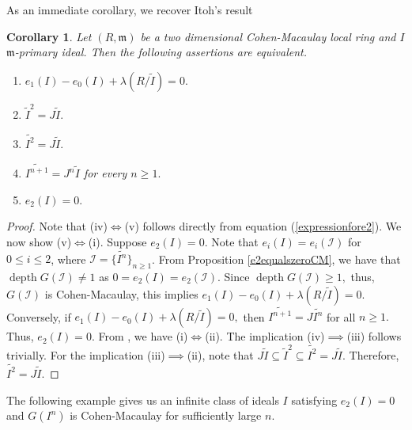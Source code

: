\documentclass[reqno,a4paper,dvipsnames]{amsart}
\newcommand{\m}{\mathfrak{m} }
\newcommand{\depth}{\operatorname{depth}}
\newtheorem{corollary}[theorem]{Corollary}
\theoremstyle{definition}
\begin{document}
As an immediate corollary, we recover Itoh's result \cite[Corollary 5]{itoh}

\begin{corollary}\cite[Corollary 5]{itoh} Let $(R, \m)$ be a two dimensional Cohen-Macaulay local ring and $I$ $\m$-primary ideal.
Then the following assertions are equivalent.
\begin{enumerate} [\normalfont(i)]
    \item $e_{1}(I)-e_{0}(I)+\lambda(R/\widetilde{I})=0.$
    \item $\widetilde{I}^{2}=J\widetilde{I}.$
    \item $\widetilde{I^{2}}=J\widetilde{I}.$
    \item $\widetilde{I^{n+1}}=J^{n}\widetilde{I}$ for every $n \geq 1.$
    \item $e_{2}(I)=0.$
\end{enumerate}
\end{corollary}
\begin{proof}
Note  that (iv)$\iff$(v) follows directly from equation (\ref{expressionfore2}).  We now show (v)$\iff$(i). Suppose $e_{2}(I)=0.$ Note that  $e_{i}(I)=e_{i}(\mathcal{I})$ for $0\leq i\leq 2$, where $\mathcal{I}=\{\widetilde{I^{n}}\}_{n\geq1}$. From Proposition \ref{e2equalszeroCM}, we have that $\depth G(\mathcal{I}) \neq 1$ as  $0=e_{2}(I)=e_{2}(\mathcal{I}).$ Since $\depth G(\mathcal{I}) \geq 1,$ thus, $G(\mathcal{I})$ is Cohen-Macaulay, this implies $e_{1}(I)-e_{0}(I)+\lambda(R/\widetilde{I})=0.$ Conversely, if $e_{1}(I)-e_{0}(I)+\lambda(R/\widetilde{I})=0,$ then $\widetilde{I^{n+1}}=J\widetilde{I^n}$ for all $n \geq 1.$ Thus, $e_{2}(I)=0.$
From \cite{huneke}, we have (i)$\iff$(ii).  The implication (iv)$\implies$(iii) follows trivially. For the implication (iii)$\implies$(ii), note that $J\widetilde{I} \subseteq \widetilde{I}^{2}\subseteq \widetilde{I^{2}}=J\widetilde{I}.$ Therefore, $\widetilde{I^{2}} =J\widetilde{I}.$
\end{proof}

\allowdisplaybreaks
The following example gives us an infinite class of ideals $I$ satisfying    $e_{2}(I)=0$ and $G(I^{n})$ is Cohen-Macaulay for sufficiently large $n.$
\end{document}
